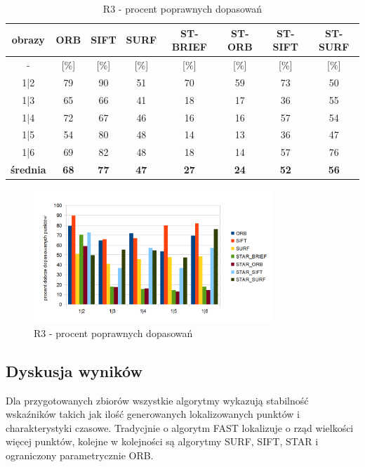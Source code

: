 \begin{table}[htbp]
  \centering
  \caption{R3 - procent poprawnych dopasowań}
    \begin{tabular}{|c|c|c|c|c|c|c|c|}\hline
    obrazy & \textbf{ORB} & \textbf{SIFT} & \textbf{SURF} & \textbf{ST-BRIEF} & \textbf{ST-ORB} & \textbf{ST-SIFT} & \textbf{ST-SURF} \\\hline
     - & [\%] & [\%] & [\%] & [\%] & [\%] & [\%] & [\%] \\\hline
    1|2 & 79 & 90 & 51 & 70 & 59 & 73 & 50 \\
    1|3 & 65 & 66 & 41 & 18 & 17 & 36 & 55 \\
    1|4 & 72 & 67 & 46 & 16 & 16 & 57 & 54 \\
    1|5 & 54 & 80 & 48 & 14 & 13 & 36 & 47 \\
    1|6 & 69 & 82 & 48 & 18 & 14 & 57 & 76 \\\hline
    \textbf{średnia} & \textbf{68} & \textbf{77} & \textbf{47} & \textbf{27} & \textbf{24} & \textbf{52} & \textbf{56} \\\hline
    
    \end{tabular}%
  \label{tab:r3_m2}%
\end{table}%


\begin{figure}
\centering
\includegraphics[width=0.8\textwidth]{pict/slowik/r3/m2.png}
\caption{R3 - procent poprawnych dopasowań}
\label{fig:r3_m2}
\end{figure}


\FloatBarrier
\subsection{Dyskusja wyników}
Dla przygotowanych zbiorów wszystkie algorytmy wykazują stabilność wskaźników takich jak ilość generowanych lokalizowanych punktów i charakterystyki czasowe. Tradycjnie o algorytm FAST lokalizuje o rząd wielkości więcej punktów, kolejne w kolejności są algorytmy SURF, SIFT, STAR i ograniczony parametrycznie ORB.

